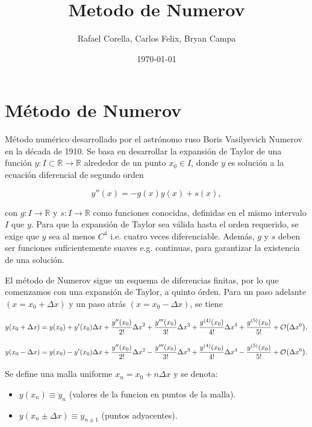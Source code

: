 \documentclass[11pt]{article}
\author{Rafael Corella, Carlos Felix, Bryan Campa}
\date{\today}
\title{Metodo de Numerov}
\begin{document}
\maketitle
\tableofcontents

\section{Método de Numerov}
\label{sec:org58b07f0}

Método numérico desarrollado por el astrónomo ruso Boris Vasilyevich Numerov en la década de 1910. Se basa en desarrollar la expansión de Taylor de una función \(y : I \subset \mathbb{R} \to \mathbb{R}\) alrededor de un punto \(x_0 \in I\), donde \(y\) es solución a la ecuación diferencial de segundo orden

\begin{equation}
\label{eq:numerov-eq}
    y''(x) = - g(x)y(x) + s(x),
\end{equation}

con \(g: I \to \mathbb{R}\) y \(s: I \to \mathbb{R}\) como funciones conocidas, definidas en el mismo intervalo \(I\) que \(y\). Para que la expansión de Taylor sea válida hasta el orden requerido, se exige que \(y\) sea al menos \(C^4\) i.e. cuatro veces diferenciable. Además, \(g\) y \(s\) deben ser funciones suficientemente suaves e.g. continuas, para garantizar la existencia de una solución.

El método de Numerov sigue un esquema de diferencias finitas, por lo que comenzamos con una expansión de Taylor, a quinto órden. Para un paso adelante \((x= x_{0} + \Delta x)\) y un paso atrás \((x=x_{0} - \Delta x)\), se tiene

\[ y(x_{0} + \Delta x ) = y(x_{0}) + y'(x_{0})\Delta x + \frac{y''(x_{0})}{2!} \Delta x^2 + \frac{y'''(x_{0})}{3!}\Delta x^3 + \frac{y^{(4)}(x_{0})}{4!}\Delta x^4 + \frac{y^{(5)}(x_0)}{5!} + \order{\Delta x^6}, \]

\[ y(x_{0} - \Delta x ) = y(x_{0}) - y'(x_{0})\Delta x + \frac{y''(x_{0})}{2!} \Delta x^2 - \frac{y'''(x_{0})}{3!}\Delta x^3 + \frac{y^{(4)}(x_{0})}{4!}\Delta x^4 - \frac{y^{(5)}(x_0)}{5!} + \order{\Delta x^6}. \]

Se define una malla uniforme \(x_n = x_0 + n\Delta x\) y se denota:

\begin{itemize}
\item \(y(x_n) \equiv y_n\) (valores de la funcion en puntos de la malla).
\item \(y(x_n \pm \Delta x) \equiv y_{n \pm 1}\) (puntos adyacentes).
\end{itemize}
\end{document}
